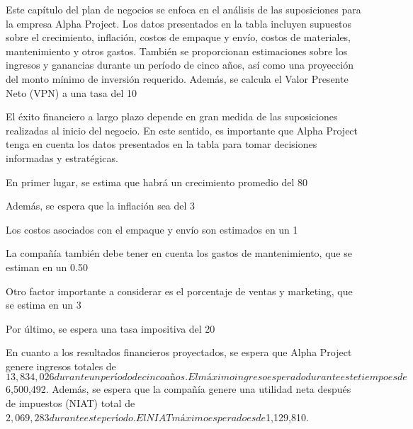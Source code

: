 Este capítulo del plan de negocios se enfoca en el análisis de las suposiciones para la empresa Alpha Project. Los datos presentados en la tabla incluyen supuestos sobre el crecimiento, inflación, costos de empaque y envío, costos de materiales, mantenimiento y otros gastos. También se proporcionan estimaciones sobre los ingresos y ganancias durante un período de cinco años, así como una proyección del monto mínimo de inversión requerido. Además, se calcula el Valor Presente Neto (VPN) a una tasa del 10%

El éxito financiero a largo plazo depende en gran medida de las suposiciones realizadas al inicio del negocio. En este sentido, es importante que Alpha Project tenga en cuenta los datos presentados en la tabla para tomar decisiones informadas y estratégicas.

En primer lugar, se estima que habrá un crecimiento promedio del 80%

Además, se espera que la inflación sea del 3%

Los costos asociados con el empaque y envío son estimados en un 1%

La compañía también debe tener en cuenta los gastos de mantenimiento, que se estiman en un 0.50%

Otro factor importante a considerar es el porcentaje de ventas y marketing, que se estima en un 3%

Por último, se espera una tasa impositiva del 20%

En cuanto a los resultados financieros proyectados, se espera que Alpha Project genere ingresos totales de $13,834,026 durante un período de cinco años. El máximo ingreso esperado durante este tiempo es de $6,500,492. Además, se espera que la compañía genere una utilidad neta después de impuestos (NIAT) total de $2,069,283 durante este período. El NIAT máximo esperado es de $1,129,810.

